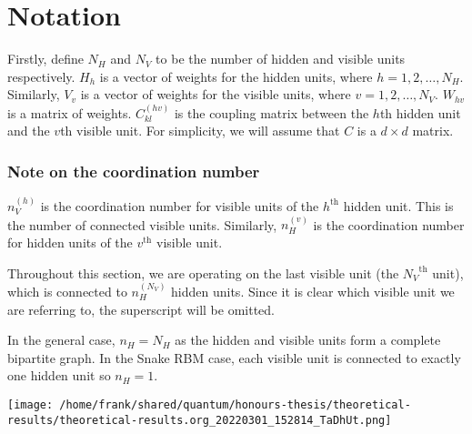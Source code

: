 \documentclass[11pt]{article}
\author{Frank Lu}
\date{\today}
\title{}
\begin{document}
\tableofcontents

\newcommand{\nH}{n_H}
\newcommand{\nV}{n_V}
\newcommand{\NH}{N_H}
\newcommand{\NV}{N_V}

\newcommand{\ls}{l_1l_2 \dots l_{\nH}}
\newcommand{\ones}{1, 1, \dots, 1}
\newcommand{\ks}{k_1k_2 \dots k_{\nH}}

\newsavebox{\mybox}
\newenvironment{Notes}
{\begin{lrbox}{\mybox}\begin{minipage}{\textwidth}}
{\end{minipage}\end{lrbox}\fbox{\usebox{\mybox}}\\}

\section{Notation}
\label{sec:orgcdf4280}
Firstly, define \(N_H\) and \(N_V\) to be the number of hidden and visible units respectively.
\(H_h\) is a vector of weights for the hidden units, where \(h = 1, 2, \dots, N_H\).
Similarly, \(V_v\) is a vector of weights for the visible units, where \(v = 1, 2, \dots, N_V\).
\(W_{h v}\) is a matrix of weights. \(C^{(hv)}_{kl}\) is the coupling matrix between the \(h\)th hidden unit and the \(v\)th visible unit. For simplicity, we will assume that \(C\) is a \(d \times d \) matrix.

\subsubsection{Note on the coordination number}
\label{sec:org17d4821}
\(n^{(h)}_V\) is the coordination number for visible units of the  \(h^{\text{th}}\) hidden unit. This is the number of connected visible units. Similarly, \(n^{(v)}_H\) is the coordination number for hidden units of the  \(v^{\text{th}}\) visible unit.

Throughout this section, we are operating on the last visible unit (the \({\NV}^{\text{th}}\) unit), which is connected to \(\nH^{(\NV)}\) hidden units. Since it is clear which visible unit we are referring to, the superscript will be omitted.

In the general case, \(\nH = \NH\) as the hidden and visible units form a complete bipartite graph. In the Snake RBM case, each visible unit is connected to exactly one hidden unit so \(\nH = 1\).

\begin{center}
\texttt{[image: /home/frank/shared/quantum/honours-thesis/theoretical-results/theoretical-results.org\_20220301\_152814\_TaDhUt.png]}
\end{center}
\end{document}
